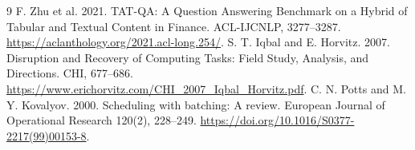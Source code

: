 \documentclass[10pt,a4paper]{article}
\begin{document}
\begin{thebibliography}{9}\small
{} F. Zhu et al. 2021. TAT-QA: A Question Answering Benchmark on a
Hybrid of Tabular and Textual Content in Finance. ACL-IJCNLP, 3277--3287.
\url{https://aclanthology.org/2021.acl-long.254/}.
 S. T. Iqbal and E. Horvitz. 2007. Disruption and Recovery of
Computing Tasks: Field Study, Analysis, and Directions. CHI, 677--686.
\url{https://www.erichorvitz.com/CHI_2007_Iqbal_Horvitz.pdf}.
 C. N. Potts and M. Y. Kovalyov. 2000. Scheduling with batching:
A review. European Journal of Operational Research 120(2), 228--249.
\url{https://doi.org/10.1016/S0377-2217(99)00153-8}.
\end{thebibliography}
\end{document}
